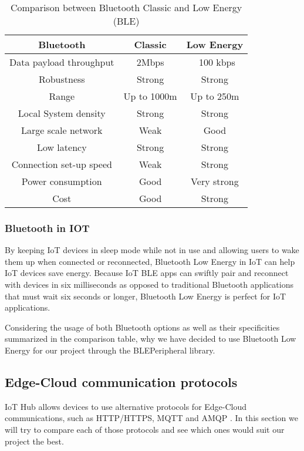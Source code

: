 \begin{table}[htbp]
    \centering
    \begin{tabular}{|c|c|c|}
        \hline
        \textbf{Bluetooth} & \textbf{Classic} & \textbf{Low Energy}  \\
        \hline
        Data payload throughput & 2Mbps & ~100 kbps\\
        \hline
        Robustness & Strong & Strong\\
        \hline
        Range & Up to 1000m & Up to 250m\\
        \hline
        Local System density & Strong & Strong\\
        \hline
        Large scale network & Weak & Good\\
        \hline
        Low latency & Strong & Strong\\
        \hline
        Connection set-up speed & Weak & Strong\\
        \hline
        Power consumption & Good & Very strong\\
        \hline
        Cost & Good & Strong \\
        \hline
        \end{tabular}
    \caption{Comparison between Bluetooth Classic and Low Energy (BLE) \cite{b4}}
    \label{tab:my_label}
\end{table}

\subsubsection{Bluetooth in IOT}
By keeping IoT devices in sleep mode while not in use and allowing users to wake them up when connected or reconnected, Bluetooth Low Energy in IoT can help IoT devices save energy. Because IoT BLE apps can swiftly pair and reconnect with devices in six milliseconds as opposed to traditional Bluetooth applications that must wait six seconds or longer, Bluetooth Low Energy is perfect for IoT applications.

Considering the usage of both Bluetooth options as well as their specificities summarized in the comparison table, why we have decided to use Bluetooth Low Energy for our project through the BLEPeripheral library.

\subsection{Edge-Cloud communication protocols}
IoT Hub allows devices to use alternative protocols for Edge-Cloud communications, such as HTTP/HTTPS, MQTT and AMQP \cite{b1}. In this section we will try to compare each of those protocols and see which ones would suit our project the best.

